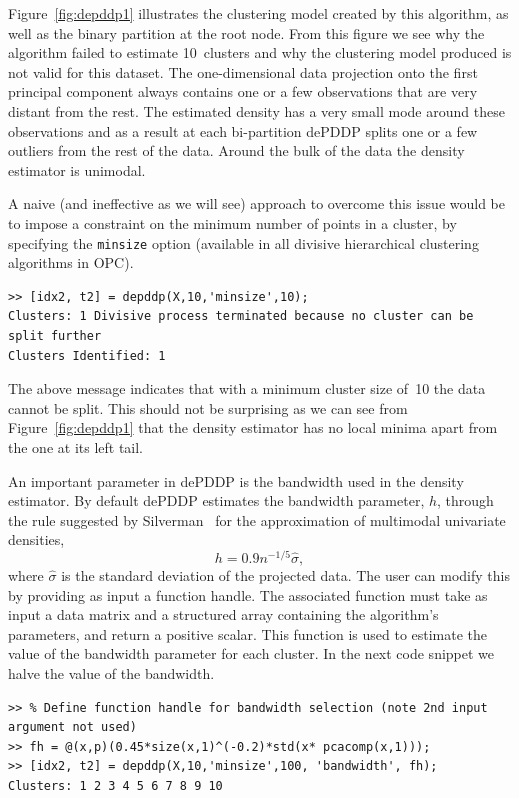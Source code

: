 \documentclass{book}
\begin{document}
Figure~\ref{fig:depddp1} illustrates the clustering model created by this
algorithm, as well as the binary partition at the root node. From this figure
we see why the algorithm failed to estimate 10~clusters and why the clustering
model produced is not valid for this dataset.
%
The one-dimensional data projection onto the first principal component 
always contains one or a few
observations that are very distant from the rest. The estimated density
has a very small mode around these observations and as a result at each
bi-partition dePDDP splits one or a few outliers from the rest of the
data. Around the bulk of the data the density estimator is unimodal.

A naive (and ineffective as we will see) approach to overcome this issue would be to impose
a constraint on the minimum number of points in a cluster,
by specifying the {\tt minsize} option 
(available in all divisive hierarchical clustering algorithms in OPC).


\begin{lstlisting}
>> [idx2, t2] = depddp(X,10,'minsize',10);
Clusters: 1 Divisive process terminated because no cluster can be split further
Clusters Identified: 1
\end{lstlisting}


\noindent
%
The above message indicates that with a minimum cluster size of~10 the
data cannot be split.
%
This should not be surprising as we can see from Figure~\ref{fig:depddp1}
that the density estimator has no local minima apart from the one at its left tail.


An important parameter in dePDDP is the bandwidth used in the density
estimator. By default dePDDP estimates the bandwidth
parameter, $h$, through the rule suggested by Silverman~\cite{Silverman1986}
for the approximation of multimodal univariate densities,
%
\[
h = 0.9 n^{-1/5} \hat{\sigma}, 
\]
%
where $\hat{\sigma}$ is the standard deviation of the projected data.
%
The user can modify this by providing as input a function handle.
The associated function must take as input a data matrix and a structured array
containing the algorithm's parameters, and return a positive scalar. This function
is used to estimate the value of the bandwidth parameter for each cluster.
In the next code snippet we halve the value of the bandwidth.


\begin{lstlisting}
>> % Define function handle for bandwidth selection (note 2nd input argument not used)
>> fh = @(x,p)(0.45*size(x,1)^(-0.2)*std(x* pcacomp(x,1)));
>> [idx2, t2] = depddp(X,10,'minsize',100, 'bandwidth', fh);
Clusters: 1 2 3 4 5 6 7 8 9 10
\end{lstlisting}
\end{document}
